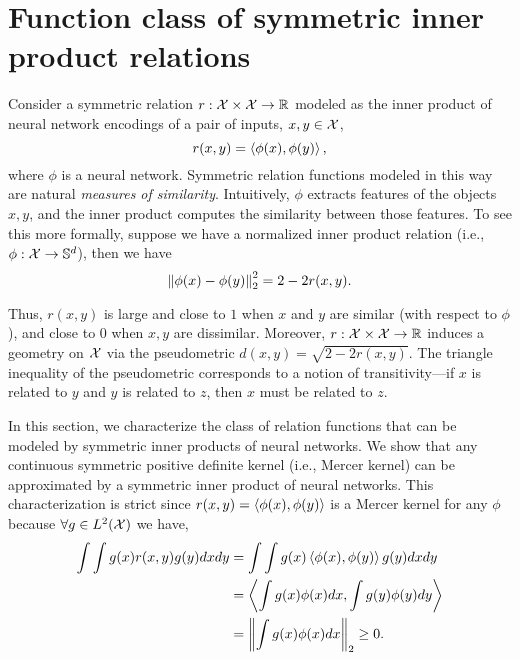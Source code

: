 \section{Function class of symmetric inner product relations}\label{sec:symmetric_relations}

Consider a symmetric relation $r: {\mathcal{X}} \times {\mathcal{X}} \to \mathbb{R}$ modeled as the inner product of neural network encodings of a pair of inputs, $x, y \in {\mathcal{X}}$,
\begin{equation}\label{eq:symmetric_iprod_relation}
    r(x, y) = \iprod{\phi(x)}{\phi(y)},
\end{equation}
where $\phi$ is a neural network. Symmetric relation functions modeled in this way are natural \textit{measures of similarity}. Intuitively, $\phi$ extracts features of the objects $x,y$, and the inner product computes the similarity between those features. To see this more formally, suppose we have a normalized inner product relation (i.e., $\phi: {\mathcal{X}} \to {\mathbb{S}}^{d}$), then we have
\begin{equation}
    \twonorm{\phi(x) - \phi(y)}^2 = 2 - 2 r(x, y).
\end{equation}


Thus, $r(x,y)$ is large and close to $1$ when $x$ and $y$ are similar (with respect to $\phi$), and close to $0$ when $x, y$ are dissimilar. Moreover, $r: {\mathcal{X}} \times {\mathcal{X}} \to \mathbb{R}$ induces a geometry on ${\mathcal{X}}$ via the pseudometric $d(x,y) = \sqrt{2 - 2 r(x,y)}$. The triangle inequality of the pseudometric corresponds to a notion of transitivity---if $x$ is related to $y$ and $y$ is related to $z$, then $x$ must be related to $z$.

In this section, we characterize the class of relation functions that can be modeled by symmetric inner products of neural networks. We show that any continuous symmetric positive definite kernel (i.e., Mercer kernel) can be approximated by a symmetric inner product of neural networks. This characterization is strict since $r(x,y) = \left \langle \phi(x), \phi(y) \right\rangle$ is a Mercer kernel for any $\phi$ because $\forall g \in L^2({\mathcal{X}})$ we have,
\begin{equation*}
    \begin{split}
        \int \int g(x) r(x,y) g(y) dx dy &= \int \int g(x) \iprod{\phi(x)}{\phi(y)} g(y) dx dy \\
        &= \iprod{\int g(x) \phi(x) dx}{\int g(y) \phi(y) dy} \\
        &= \twonorm{\int g(x) \phi(x) dx} \geq 0.
    \end{split}
\end{equation*}

